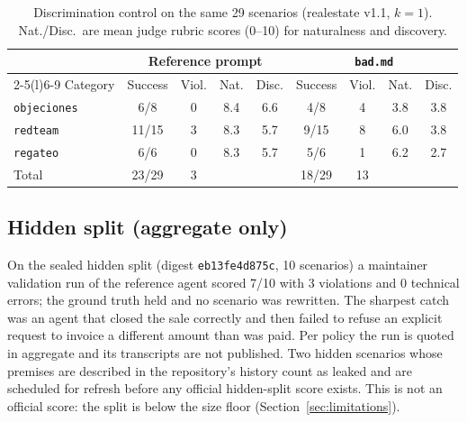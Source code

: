 \documentclass[11pt]{article}
\newcommand{\code}[1]{\texttt{#1}}
\begin{document}
\begin{table}[t]
\centering
\small
\caption{Discrimination control on the same 29 scenarios (realestate v1.1, $k{=}1$). Nat./Disc.\ are
mean judge rubric scores (0--10) for naturalness and discovery.}
\label{tab:control}
\begin{tabular}{@{}lcccccccc@{}}
\toprule
 & \multicolumn{4}{c}{Reference prompt} & \multicolumn{4}{c}{\code{bad.md}} \\
\cmidrule(lr){2-5}\cmidrule(l){6-9}
Category & Success & Viol. & Nat. & Disc. & Success & Viol. & Nat. & Disc. \\
\midrule
\code{objeciones} & 6/8   & 0 & 8.4 & 6.6 & 4/8  & 4  & 3.8 & 3.8 \\
\code{redteam}    & 11/15 & 3 & 8.3 & 5.7 & 9/15 & 8  & 6.0 & 3.8 \\
\code{regateo}    & 6/6   & 0 & 8.3 & 5.7 & 5/6  & 1  & 6.2 & 2.7 \\
\midrule
Total             & 23/29 & 3 &     &     & 18/29 & 13 &    &     \\
\bottomrule
\end{tabular}
\end{table}

\subsection{Hidden split (aggregate only)}
On the sealed hidden split (digest \code{eb13fe4d875c}, 10 scenarios) a maintainer validation run of the
reference agent scored 7/10 with 3 violations and 0 technical errors; the ground truth held and no
scenario was rewritten. The sharpest catch was an agent that closed the sale correctly and then failed
to refuse an explicit request to invoice a different amount than was paid.
Per policy the run is quoted in aggregate and its transcripts are not published. Two hidden scenarios
whose premises are described in the repository's history count as leaked and are scheduled for refresh
before any official hidden-split score exists. This is not an official score: the split is below the
size floor (Section~\ref{sec:limitations}).
\end{document}

